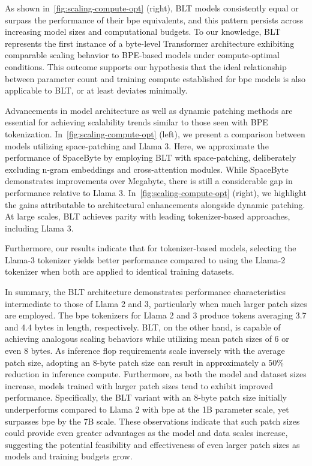 As shown in~\autoref{fig:scaling-compute-opt} (right), {\textsc BLT} models consistently equal or surpass the performance of their bpe equivalents, and this pattern persists across increasing model sizes and computational budgets. To our knowledge, {\textsc BLT} represents the first instance of a byte-level Transformer architecture exhibiting comparable scaling behavior to BPE-based models under compute-optimal conditions. This outcome supports our hypothesis that the ideal relationship between parameter count and training compute established for bpe models is also applicable to {\textsc BLT}, or at least deviates minimally.

Advancements in model architecture as well as dynamic patching methods are essential for achieving scalability trends similar to those seen with BPE tokenization. In~\autoref{fig:scaling-compute-opt} (left), we present a comparison between models utilizing space-patching and Llama 3. Here, we approximate the performance of SpaceByte \citep{slagle2024spacebyte} by employing {\textsc BLT} with space-patching, deliberately excluding n-gram embeddings and cross-attention modules. While SpaceByte demonstrates improvements over Megabyte, there is still a considerable gap in performance relative to Llama 3. In~\autoref{fig:scaling-compute-opt} (right), we highlight the gains attributable to architectural enhancements alongside dynamic patching. At large scales, {\textsc BLT} achieves parity with leading tokenizer-based approaches, including Llama 3.

Furthermore, our results indicate that for tokenizer-based models, selecting the Llama-3 tokenizer yields better performance compared to using the Llama-2 tokenizer when both are applied to identical training datasets.

In summary, the {\textsc BLT} architecture demonstrates performance characteristics intermediate to those of Llama 2 and 3, particularly when much larger patch sizes are employed. The bpe tokenizers for Llama 2 and 3 produce tokens averaging 3.7 and 4.4 bytes in length, respectively. {\textsc BLT}, on the other hand, is capable of achieving analogous scaling behaviors while utilizing mean patch sizes of 6 or even 8 bytes. As inference flop requirements scale inversely with the average patch size, adopting an 8-byte patch size can result in approximately a 50\% reduction in inference compute. Furthermore, as both the model and dataset sizes increase, models trained with larger patch sizes tend to exhibit improved performance. Specifically, the {\textsc BLT} variant with an 8-byte patch size initially underperforms compared to Llama 2 with bpe at the 1B parameter scale, yet surpasses bpe by the 7B scale. These observations indicate that such patch sizes could provide even greater advantages as the model and data scales increase, suggesting the potential feasibility and effectiveness of even larger patch sizes as models and training budgets grow.

